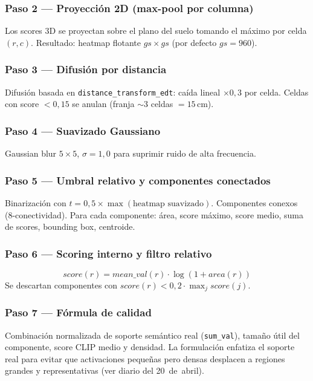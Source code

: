 \documentclass[11pt,a4paper]{article}
\begin{document}
\subsubsection*{Paso 2 --- Proyección 2D (max-pool por columna)}

Los scores 3D se proyectan sobre el plano del suelo tomando el máximo por
celda $(r, c)$. Resultado: heatmap flotante $gs \times gs$ (por defecto
$gs = 960$).

\subsubsection*{Paso 3 --- Difusión por distancia}

Difusión basada en \texttt{distance\_transform\_edt}: caída lineal $\times
0{,}3$ por celda. Celdas con score $< 0{,}15$ se anulan (franja $\sim$3
celdas $=15$\,cm).

\subsubsection*{Paso 4 --- Suavizado Gaussiano}

Gaussian blur $5\times5$, $\sigma=1{,}0$ para suprimir ruido de alta
frecuencia.

\subsubsection*{Paso 5 --- Umbral relativo y componentes conectados}

Binarización con $t = 0{,}5 \times \max(\text{heatmap suavizado})$.
Componentes conexos (8-conectividad). Para cada componente: área, score
máximo, score medio, suma de scores, bounding box, centroide.

\subsubsection*{Paso 6 --- Scoring interno y filtro relativo}

\[
  \textit{score}(r) = \textit{mean\_val}(r) \cdot \log(1 + \textit{area}(r))
\]
Se descartan componentes con
$\textit{score}(r) < 0{,}2 \cdot \max_j \textit{score}(j)$.

\subsubsection*{Paso 7 --- Fórmula de calidad}

Combinación normalizada de soporte semántico real (\texttt{sum\_val}), tamaño
útil del componente, score CLIP medio y densidad. La formulación enfatiza el
soporte real para evitar que activaciones pequeñas pero densas desplacen a
regiones grandes y representativas (ver diario del 20~de~abril).
\end{document}
